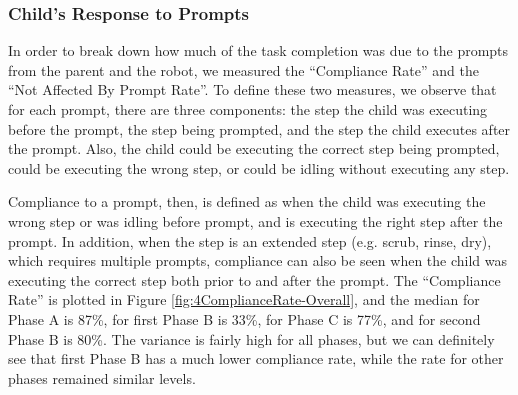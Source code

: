 \subsubsection{Child's Response to Prompts}
In order to break down how much of the task completion was due to the prompts from the parent and the robot, we measured the ``Compliance Rate'' and the ``Not Affected By Prompt Rate''.  To define these two measures, we observe that for each prompt, there are three components: the step the child was executing before the prompt, the step being prompted, and the step the child executes after the prompt.  Also, the child could be executing the correct step being prompted, could be executing the wrong step, or could be idling without executing any step.

Compliance to a prompt, then, is defined as when the child was executing the wrong step or was idling before prompt, and is executing the right step after the prompt.  In addition, when the step is an extended step (e.g. scrub, rinse, dry), which requires multiple prompts, compliance can also be seen when the child was executing the correct step both prior to and after the prompt.  The ``Compliance Rate'' is plotted in Figure \ref{fig:4ComplianceRate-Overall}, and the median for Phase A is 87\%, for first Phase B is 33\%, for Phase C is 77\%, and for second Phase B is 80\%.  The variance is fairly high for all phases, but we can definitely see that first Phase B has a much lower compliance rate, while the rate for other phases remained similar levels.

